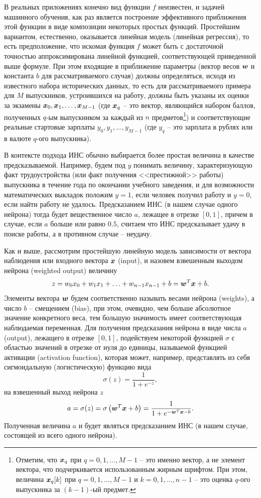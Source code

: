 \documentclass[a4paper,12pt,russian]{article} %
\begin{document}
В реальных приложениях конечно вид функции $f$ неизвестен, и задачей машинного обучения, как раз является построение эффективного приближения этой функции в виде композиции некоторых простых функций.
Простейшим вариантом, естественно, оказывается линейная модель (линейная регрессия), то есть предположение, что искомая функция $f$ может быть с достаточной точностью аппроксимирована линейной функцией, соответствующей приведенной выше формуле.
При этом входящие в приближение параметры (вектор весов $\bm{w}$ и константа $b$ для рассматриваемого случая) должны определяться, исходя из известного набора исторических данных, то есть для рассматриваемого примера для $M$ выпускников, устроившихся на работу, должны быть указаны их оценки за экзамены $\bm{x}_0, \bm{x}_1, \ldots, \bm{x}_{M-1}$ (где $\bm{x}_q$ -- это вектор, являющийся набором баллов, полученных $q$-ым выпускником за каждый из $n$ предметов\footnote{
	Отметим, что $\bm{x}_q$ при $q=0, 1, \ldots, M-1$ -- это именно вектор, а не элемент вектора, что подчеркивается использованным жирным шрифтом.
	При этом, величина $\bm{x}_q [k]$ при $q=0, 1, \ldots, M-1$ и $k=0, 1, \ldots, n-1$ -- это оценка $q$-ого выпускника за $(k-1)$-ый предмет.
}) и соответствующие реальные стартовые зарплаты $y_0, y_1, \ldots, y_{M-1}$ (где $y_q$ -- это зарплата в рублях или в валюте $q$-ого выпускника).

В контексте подхода ИНС обычно выбирается более простая величина в качестве предсказываемой.
Например, будем под $y$ понимать величину, характеризующую факт трудоустройства (или факт получения <<престижной>> работы) выпускника в течение года по окончании учебного заведения, и для возможности математических выкладок положим $y=1$, если человек получил работу и $y=0$, если найти работу не удалось.
Предсказанием ИНС (в нашем случае одного нейрона) тогда будет вещественное число $a$, лежащее в отрезке $[0, 1]$, причем в случае, если $a$ больше или равно $0.5$, считаем что ИНС предсказывает удачу в поиске работы, а в противном случае -- неудачу.

Как и выше, рассмотрим простейшую линейную модель зависимости от вектора наблюдения или входного вектора $\bm{x}$ (input), и назовем взвешенным выходом нейрона (weighted output) величину
$$
	z = w_0 x_0 + w_1 x_1 + \ldots + w_{n-1} x_{n-1} + b = \bm{w}^T \bm{x} + b.
$$
Элементы вектора $\bm{w}$ будем соответственно называть весами нейрона (weights), а число $b$ -- смещением (bias), при этом, очевидно, чем больше абсолютное значение конкретного веса, тем большую значимость имеет соответствующая наблюдаемая переменная.
Для получения предсказания нейрона в виде числа $a$ (output), лежащего в отрезке $[0, 1]$, подействуем некоторой функцией $\sigma$ с областью значений  в отрезке от нуля до единицы, называемой функцией активации (activation function), которая может, например, представлять из себя сигмоидальную (логистическую) функцию вида
$$
	\sigma(z) = \frac{1}{1+e^{-z}},
$$
на взвешенный выход нейрона $z$
$$
	a = \sigma(z) =  \sigma \left( \bm{w}^T \bm{x} + b \right) = \frac{1}{1+e^{-\bm{w}^T \bm{x} - b}} .
$$
Полученная величина $a$ и будет являться предсказанием ИНС (в нашем случае, состоящей из всего одного нейрона).
\end{document}
